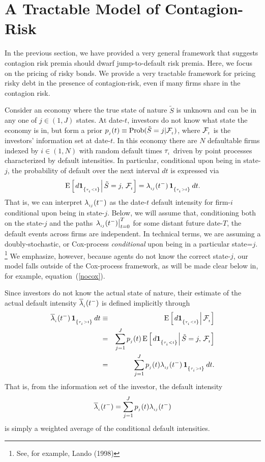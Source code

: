 \documentclass[titlepage,11pt]{article}
\def\bq{\begin{equation}}
\def\eq{\end{equation}}
\def\by{\begin{eqnarray}}
\def\ey{\end{eqnarray}}
\def\nn{\nonumber}
\begin{document}
\section{A Tractable Model of Contagion-Risk}
\renewcommand{\lb}{\overline{\lambda}}

In the previous section, we have provided a very general framework that suggests
contagion risk premia should dwarf jump-to-default risk premia.  Here, we focus
on the pricing of risky bonds.  We provide a very tractable framework for pricing
risky debt in the presence of contagion-risk, even if many firms share in the contagion
risk.

Consider an economy where the true state of nature $\tilde{S}$ is
unknown and can be in any one of $j \in(1,J)$ states.  At date-$t$,
investors do not know what state the economy is in, but form a prior
$p_{_{{j}}}(t) \equiv \mbox{Prob}(\tilde{S} = j | {\cal F}_{_{{t}}})$, where
${\cal F}_{_{{t}}}$ is the investors' information set at date-$t$. In this
economy there are $N$ defaultable firms indexed by $i \in(1,N)$ with
random default times $\tau_{_{{i}}}$ driven by point processes
characterized by default intensities.  In particular, conditional
upon being in state-$j$, the probability of default over the next
interval $dt$ is expressed via \bq\label{lamij} \mbox{E}\left[\left.
d\ind{\ti<t} \right| \tilde{S} = j, \, \F\sub{t} \right] =
\lambda\sub{ij}(t^{-}) \, \ind{\ti>t} \, dt. \eq That is, we can
interpret $\lambda_{_{{ij}}}(t^{-})$ as the date-$t$ default intensity
for firm-$i$ conditional upon being in state-$j$.  Below, we will
assume that, conditioning both on the state-$j$ and the paths
$\left. \lambda_{_{{ij}}}(t^{-})\right|_{t=0}^{T}$ for some distant
future date-$T$, the default events across firms are independent. In
technical terms, we are assuming a doubly-stochastic, or Cox-process
{\em conditional} upon being in a particular state=$j$.
\footnote{See, for example, Lando (1998)} We emphasize, however,
because agents do not know the correct state-$j$, our model falls
outside of the Cox-process framework, as will be made clear below
in, for example, equation~(\ref{nocox}).

Since investors do not know the actual state of nature, their
estimate of the actual default intensity $\lb\sub{i}(t^{-})$ is
defined implicitly through \by \lb\sub{i}(t^{-}) \, \ind{\ti>t} \,
dt &\equiv&
\mbox{E} \left[ \left. d\ind{\ti<t} \right| \F\sub{t} \right]  \nn \\
%
&=& \sum_{j=1}^{J} p\sub{j}(t) \, \mbox{E} \left[ \left.
d\ind{\ti<t} \right| \tilde{S} = j, \, \F\sub{t} \right]
\nn \\
%
\label{lambar2} &=& \sum_{j=1}^{J} p\sub{j}(t)
\lambda\sub{ij}(t^{-}) \, \ind{\ti>t} \, dt. \ey That is, from the
information set of the investor, the default intensity
\bq\label{lambar} \lb\sub{i}(t^{-}) = \sum_{j=1}^{J} p\sub{j}(t)
\lambda\sub{ij}(t^{-}) \eq is simply a weighted average of the
conditional default intensities.
\end{document}
